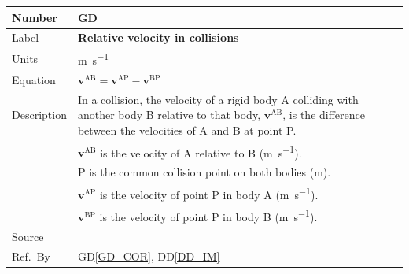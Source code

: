 \documentclass[12pt]{article}
\newcommand{\colAwidth}{0.13\textwidth}
\newcommand{\colBwidth}{0.82\textwidth}
\newcounter{defnum} %
\begin{document}
\noindent
\begin{minipage}{\textwidth}
	\renewcommand*{\arraystretch}{1.5}
	\begin{tabular}{| p{\colAwidth} | p{\colBwidth}|}
		\hline
		\rowcolor[gray]{0.9}
		Number& GD{defnum}\thedefnum \label{GD_RV}\\
		\hline
		Label&\bf  Relative velocity in collisions \\
		\hline
		Units & \si{\metre\per\second} \\
		\hline
		Equation& $\mathbf{v}^\mathrm{AB} = \mathbf{v}^\mathrm{AP} - \mathbf{v}^\mathrm{BP}$ \\
		\hline
		Description &  
		In a collision, the velocity of a rigid body A colliding with another body B relative to that body, $\mathbf{v}^\mathrm{AB}$, is the difference between the velocities of A and B at point P. \\
		& $\mathbf{v}^\mathrm{AB}$ is the velocity of A relative to B (\si{\metre\per\second}). \\ 
		& P is the common collision point on both bodies (\si{\metre}). \\
		& $\mathbf{v}^\mathrm{AP}$ is the velocity of point P in body A (\si{\metre\per\second}). \\
		& $\mathbf{v}^\mathrm{BP}$ is the velocity of point P in body B (\si{\metre\per\second}).\\
		\hline
		Source & \\
		\hline
		Ref.\ By& GD\ref{GD_COR}, DD\ref{DD_IM}\\
		\hline
	\end{tabular}
\end{minipage}

~\newline
\end{document}
